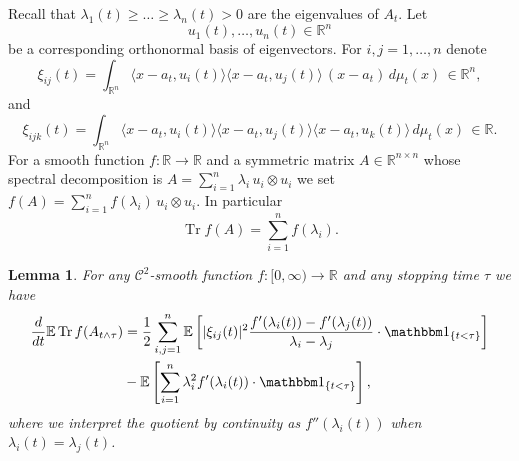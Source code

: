 \documentclass[12pt,a4paper]{article}
\newcommand{\Tr}{\mathop{\mathrm{Tr}}\nolimits}
\newcommand{\E}{\mathbb{E}}
\newcommand{\RR}{\mathbb{R}}
\newcommand{\R}{\mathbb{R}}
\newtheorem{lemma}[theorem]{Lemma}
\theoremstyle{definition}
\begin{document}
Recall that $\lambda_1(t) \geq \ldots \geq \lambda_n (t) > 0$ are the eigenvalues of  $A_t$.
Let 
\[ 
u_1(t),\ldots,u_n(t) \in \R^n 
\]
be a corresponding orthonormal basis of eigenvectors.
For $i,j=1,\ldots,n$ denote
\begin{equation} \label{eq_4700}
\xi_{ij}(t) = \int_{\R^n} \langle x - a_t, u_i(t)\rangle
\langle x - a_t , u_j(t)\rangle \,  (x - a_t)  \, d\mu_t(x) \,  \in \R^n,
\end{equation}
and
$$ \xi_{ijk}(t) = \int_{\R^n} \langle x - a_t, u_i(t) \rangle
\langle x - a_t, u_j(t) \rangle
\langle x - a_t , u_k(t) \rangle \, d\mu_t(x) \, \in \R.
$$
For a smooth function $f: \R \rightarrow \R$ and a symmetric matrix $A \in \RR^{n \times n}$
whose spectral decomposition is $A = \sum_{i=1}^n \lambda_i \, u_i \otimes u_i$
we set $f(A)= \sum_{i=1}^n f(\lambda_i) \, u_i \otimes u_i$. In particular
$$ \Tr f(A) = \sum_{i=1}^n f(\lambda_i) . $$

\begin{lemma}
For any $\mathcal C^2$-smooth function $f: [0, \infty) \rightarrow \R$
and any stopping time $\tau$ we have
\begin{equation}
\begin{split}
\frac{d}{dt} \E\Tr f(A_{t\wedge \tau})
& = \frac{1}{2} \sum_{i,j=1}^n \E  \left[  |\xi_{ij}(t)|^2
\frac{f'(\lambda_i(t)) - f'(\lambda_j(t))}{\lambda_i - \lambda_j}
\cdot \mathbbm 1_{\{t < \tau\}} \right] \\
& - \E \left[ \sum_{i=1}^n \lambda_i^2 f'(\lambda_i(t)) \cdot \mathbbm 1_{\{t < \tau\}} \right],
\end{split}
\label{eq_1016} \end{equation}
where we interpret the quotient by continuity as $f''(\lambda_i(t))$
when $\lambda_i (t) = \lambda_j (t)$.
\label{lem_1413}
\end{lemma}
\end{document}
